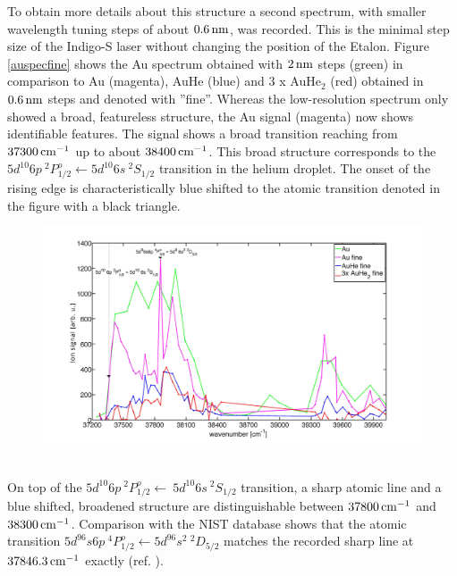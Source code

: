 \documentclass[parskip,12pt,headsepline,a4paper] {scrbook}
\begin{document}
\newpage

To obtain more details about this structure a second spectrum, with smaller wavelength tuning steps of about $\unit[0.6]{nm}$, was recorded. This is the minimal step size of the Indigo-S laser without changing the position of the Etalon. Figure \ref{auspecfine} shows the Au spectrum obtained with $\unit[2]{nm}$ steps (green) in comparison to Au (magenta), AuHe (blue) and 3 x AuHe$_2$ (red) obtained in $\unit[0.6]{nm}$ steps and denoted with ''fine''. Whereas the low-resolution spectrum only showed a broad, featureless structure, the Au signal (magenta) now shows identifiable features. The signal shows a broad transition reaching from $\unit[37300]{cm^{-1}}$ up to about $\unit[38400]{cm^{-1}}$. This broad structure corresponds to the $5d^{10}6p \ ^2P^o_{1/2} \leftarrow 5d^{10}6s \ ^2S_{1/2}$ transition in the helium droplet. The onset of the rising edge is characteristically blue shifted to the atomic transition denoted in the figure with a black triangle.
\begin{figure}[ht]
\centerline{
\includegraphics[width=17cm]{./results/au_specFine_new.jpg}}
\end{figure}\\
On top of the $5d^{10}6p \ ^2P^o_{1/2} \leftarrow \ 5d^{10} 6s \ ^2S_{1/2}$ transition, a sharp atomic line and a blue shifted, broadened structure are distinguishable between $\unit[37800]{cm^{-1}}$ and $\unit[38300]{cm^{-1}}$. Comparison with the NIST database shows that the atomic transition $5d^96s6p \ ^4P^o_{1/2} \leftarrow 5d^96s^2 \ ^2D_{5/2}$ matches the recorded sharp line at $\unit[37 846.3]{cm^{-1}}$ exactly (ref. \cite{nist}). %
\end{document}
